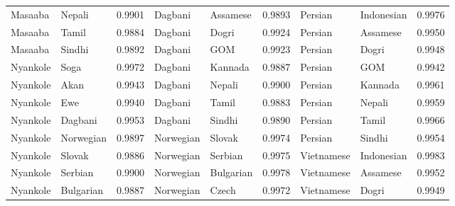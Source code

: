 \documentclass[11pt]{article} %
\begin{document}
\begin{table}
\begin{tabular}{llr@{\hspace{12pt}}llr@{\hspace{12pt}}llr}
            Masaaba                      & Nepali              & 0.9901        & Dagbani             & Assamese            & 0.9893        & Persian             & Indonesian          & 0.9976        \\
            Masaaba                      & Tamil               & 0.9884        & Dagbani             & Dogri               & 0.9924        & Persian             & Assamese            & 0.9950        \\
            Masaaba                      & Sindhi              & 0.9892        & Dagbani             & GOM                 & 0.9923        & Persian             & Dogri               & 0.9948        \\
            Nyankole                     & Soga                & 0.9972        & Dagbani             & Kannada             & 0.9887        & Persian             & GOM                 & 0.9942        \\
            Nyankole                     & Akan                & 0.9943        & Dagbani             & Nepali              & 0.9900        & Persian             & Kannada             & 0.9961        \\
            Nyankole                     & Ewe                 & 0.9940        & Dagbani             & Tamil               & 0.9883        & Persian             & Nepali              & 0.9959        \\
            Nyankole                     & Dagbani             & 0.9953        & Dagbani             & Sindhi              & 0.9890        & Persian             & Tamil               & 0.9966        \\
            Nyankole                     & Norwegian           & 0.9897        & Norwegian           & Slovak              & 0.9974        & Persian             & Sindhi              & 0.9954        \\
            Nyankole                     & Slovak              & 0.9886        & Norwegian           & Serbian             & 0.9975        & Vietnamese          & Indonesian          & 0.9983        \\
            Nyankole                     & Serbian             & 0.9900        & Norwegian           & Bulgarian           & 0.9978        & Vietnamese          & Assamese            & 0.9952        \\
            Nyankole                     & Bulgarian           & 0.9887        & Norwegian           & Czech               & 0.9972        & Vietnamese          & Dogri               & 0.9949        \\

\end{tabular}
\end{table}
\end{document}
